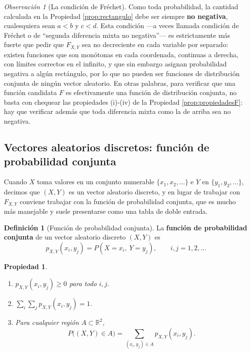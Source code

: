 \documentclass[11pt,a4paper]{article}
\theoremstyle{plain}
\newtheorem{propiedad}[teorema]{Propiedad}
\theoremstyle{definition}
\newtheorem{definicion}[teorema]{Definición}
\theoremstyle{remark}
\newtheorem{observacion}[teorema]{Observación}
\begin{document}
\begin{observacion}[La condición de Fréchet]
Como toda probabilidad, la cantidad calculada en la Propiedad \ref{prop:rectangulo} debe ser siempre \textbf{no negativa}, cualesquiera sean $a<b$ y $c<d$. Esta condición —a veces llamada condición de Fréchet o de ``segunda diferencia mixta no negativa''— es estrictamente más fuerte que pedir que $F_{X,Y}$ sea no decreciente en cada variable por separado: existen funciones que son monótonas en cada coordenada, continuas a derecha, con límites correctos en el infinito, y que sin embargo asignan probabilidad negativa a algún rectángulo, por lo que no pueden ser funciones de distribución conjunta de ningún vector aleatorio. En otras palabras, para verificar que una función candidata $F$ es efectivamente una función de distribución conjunta, no basta con chequear las propiedades (i)-(iv) de la Propiedad \ref{prop:propiedadesF}: hay que verificar además que toda diferencia mixta como la de arriba sea no negativa.
\end{observacion}

\subsection{Vectores aleatorios discretos: función de probabilidad conjunta}

Cuando $X$ toma valores en un conjunto numerable $\{x_1,x_2,\dots\}$ e $Y$ en $\{y_1,y_2,\dots\}$, decimos que $(X,Y)$ es un vector aleatorio discreto, y en lugar de trabajar con $F_{X,Y}$ conviene trabajar con la función de probabilidad conjunta, que es mucho más manejable y suele presentarse como una tabla de doble entrada.

\begin{definicion}[Función de probabilidad conjunta]
La \textbf{función de probabilidad conjunta} de un vector aleatorio discreto $(X,Y)$ es
\[
p_{X,Y}(x_i,y_j) = P(X=x_i,\ Y=y_j), \qquad i,j=1,2,\dots
\]
\end{definicion}

\begin{propiedad}
\begin{enumerate}[label=(\roman*)]
\item $p_{X,Y}(x_i,y_j)\ge 0$ para todo $i,j$.
\item $\displaystyle\sum_i\sum_j p_{X,Y}(x_i,y_j) = 1$.
\item Para cualquier región $A\subset\mathbb R^2$,
\[
P\big((X,Y)\in A\big) = \sum_{(x_i,y_j)\in A} p_{X,Y}(x_i,y_j).
\]
\end{enumerate}
\end{propiedad}
\end{document}
